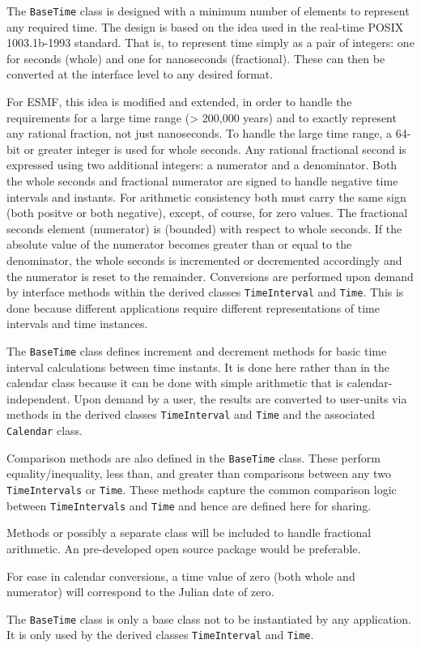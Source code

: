 
The {\tt BaseTime} class is designed with a minimum number of elements
to represent any required time.  The design is based on the idea used
in the real-time POSIX 1003.1b-1993 standard.  That is, to represent
time simply as a pair of integers: one for seconds (whole) and one for
nanoseconds (fractional).  These can then be converted at the interface
level to any desired format.

For ESMF, this idea is modified and extended, in order to handle the
requirements for a large time range (> 200,000 years) and to exactly
represent any rational fraction, not just nanoseconds.  To handle the
large time range, a 64-bit or greater integer is used for whole seconds.
Any rational fractional second is expressed using two additional integers:
a numerator and a denominator.  Both the whole seconds and fractional
numerator are signed to handle negative time intervals and instants.
For arithmetic consistency both must carry the same sign (both positve
or both negative), except, of course, for zero values.  The fractional
seconds element (numerator) is 
(bounded) with respect to whole seconds. If the absolute value of the
numerator becomes greater than or equal to the denominator, the whole
seconds is incremented or decremented accordingly and the numerator is
reset to the remainder.  Conversions are performed upon demand by
interface methods within the derived classes {\tt TimeInterval} and
{\tt Time}.  This is done because different applications require different
representations of time intervals and time instances.

The {\tt BaseTime} class defines increment and decrement methods for basic
time interval calculations between time instants.  It is done here rather
than in the calendar class because it can be done with simple arithmetic
that is calendar-independent.  Upon demand by a user, the results are
converted to user-units via methods in the derived classes {\tt TimeInterval}
and {\tt Time} and the associated {\tt Calendar} class.

Comparison methods are also defined in the {\tt BaseTime} class.  These
perform equality/inequality, less than, and greater than comparisons
between any two {\tt TimeIntervals} or {\tt Time}.  These methods capture
the common comparison logic between {\tt TimeIntervals} and {\tt Time} and
hence are defined here for sharing.

Methods or possibly a separate class will be included to handle fractional
arithmetic.  An pre-developed open source package would be preferable.

For ease in calendar conversions, a time value of zero (both whole and
numerator) will correspond to the Julian date of zero.

The {\tt BaseTime} class is only a base class not to be instantiated by any
application. It is only used by the derived classes {\tt TimeInterval} and
{\tt Time}.








